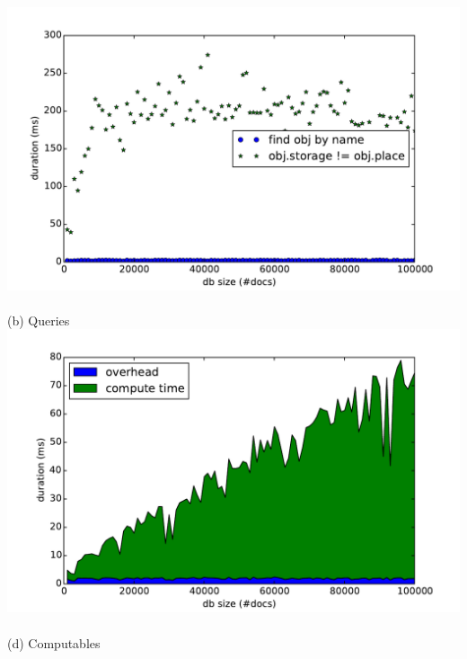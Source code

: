 \begin{frame}
\begin{columns}
    \begin{column}{0.55\textwidth}
  \centering
    \small
    \\\vspace{-0.15cm}
    \includegraphics[width=\textwidth]{../thesis/plots/query-durations-index}\\
    \\\vspace{-0.05cm}
    (b) Queries
    \\\vspace{-0.1cm}
    \includegraphics[width=\textwidth]{../thesis/plots/computable-durations-index}\\
    \\\vspace{-0.05cm}
    (d) Computables
    \end{column}
  \end{columns}
\end{frame}


